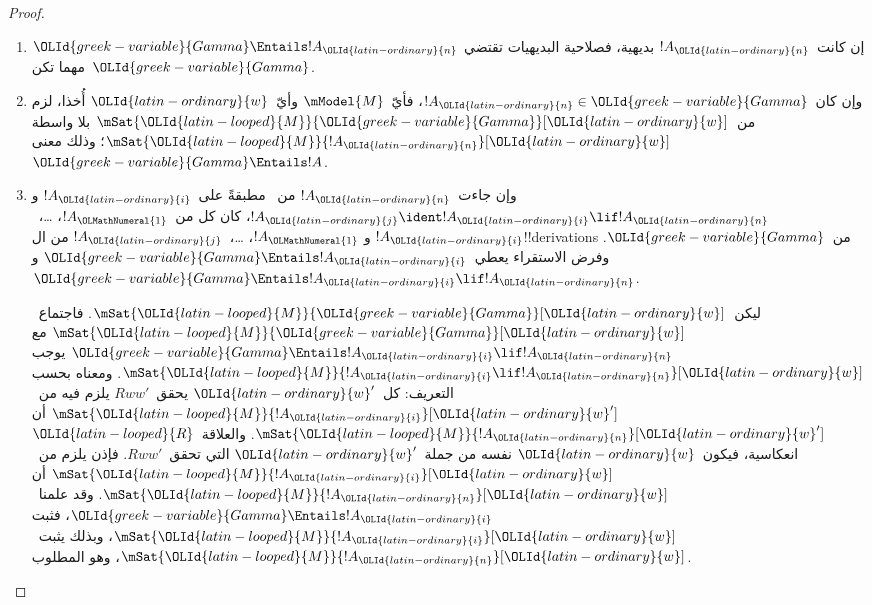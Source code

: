 \documentclass[../../../include/open-logic-section]{subfiles}
\begin{document}
\begin{proof}
  \begin{enumerate}
  \item إن كانت~$!A_{\OLId{latin-ordinary}{n}}$ بديهية، فصلاحية البديهيات تقتضي
    ${\OLId{greek-variable}{Gamma}} \Entails !A_{\OLId{latin-ordinary}{n}}$ مهما تكن~${\OLId{greek-variable}{Gamma}}$.
  \item وإن كان~$!A_{\OLId{latin-ordinary}{n}} \in {\OLId{greek-variable}{Gamma}}$، فأيّ~$\mModel{M}$ وأيّ~${\OLId{latin-ordinary}{w}}$ أُخذا،
    لزم من~$\mSat{{\OLId{latin-looped}{M}}}{{\OLId{greek-variable}{Gamma}}}[{\OLId{latin-ordinary}{w}}]$ بلا واسطة
    $\mSat{{\OLId{latin-looped}{M}}}{!A_{\OLId{latin-ordinary}{n}}}[{\OLId{latin-ordinary}{w}}]$؛ وذلك معنى~${\OLId{greek-variable}{Gamma}} \Entails !A$.
  \item وإن جاءت~$!A_{\OLId{latin-ordinary}{n}}$ من~\MP{} مطبقةً على~$!A_{\OLId{latin-ordinary}{i}}$ و
    $!A_{\OLId{latin-ordinary}{j}} \ident !A_{\OLId{latin-ordinary}{i}} \lif !A_{\OLId{latin-ordinary}{n}}$، كان كل من~$!A_{\OLMathNumeral{1}}$، \dots،~$!A_{\OLId{latin-ordinary}{i}}$ و
    $!A_{\OLMathNumeral{1}}$، \dots،~$!A_{\OLId{latin-ordinary}{j}}$ من ال!!{derivation}s من~${\OLId{greek-variable}{Gamma}}$. وفرض
    الاستقراء يعطي~${\OLId{greek-variable}{Gamma}} \Entails !A_{\OLId{latin-ordinary}{i}}$ و
    ${\OLId{greek-variable}{Gamma}} \Entails !A_{\OLId{latin-ordinary}{i}} \lif !A_{\OLId{latin-ordinary}{n}}$.

    ليكن~$\mSat{{\OLId{latin-looped}{M}}}{{\OLId{greek-variable}{Gamma}}}[{\OLId{latin-ordinary}{w}}]$. فاجتماع~$\mSat{{\OLId{latin-looped}{M}}}{{\OLId{greek-variable}{Gamma}}}[{\OLId{latin-ordinary}{w}}]$ مع
    ${\OLId{greek-variable}{Gamma}} \Entails !A_{\OLId{latin-ordinary}{i}} \lif !A_{\OLId{latin-ordinary}{n}}$ يوجب
    $\mSat{{\OLId{latin-looped}{M}}}{!A_{\OLId{latin-ordinary}{i}} \lif !A_{\OLId{latin-ordinary}{n}}}[{\OLId{latin-ordinary}{w}}]$. ومعناه بحسب التعريف: كل~${\OLId{latin-ordinary}{w}}'$
    يحقق~$Rww'$ يلزم فيه من~$\mSat{{\OLId{latin-looped}{M}}}{!A_{\OLId{latin-ordinary}{i}}}[{\OLId{latin-ordinary}{w}}']$ أن
    $\mSat{{\OLId{latin-looped}{M}}}{!A_{\OLId{latin-ordinary}{n}}}[{\OLId{latin-ordinary}{w}}']$. والعلاقة~${\OLId{latin-looped}{R}}$ انعكاسية، فيكون~${\OLId{latin-ordinary}{w}}$ نفسه من
    جملة~${\OLId{latin-ordinary}{w}}'$ التي تحقق~$Rww'$. فإذن يلزم من~$\mSat{{\OLId{latin-looped}{M}}}{!A_{\OLId{latin-ordinary}{i}}}[{\OLId{latin-ordinary}{w}}]$ أن
    $\mSat{{\OLId{latin-looped}{M}}}{!A_{\OLId{latin-ordinary}{n}}}[{\OLId{latin-ordinary}{w}}]$. وقد علمنا~${\OLId{greek-variable}{Gamma}} \Entails !A_{\OLId{latin-ordinary}{i}}$، فثبت
    $\mSat{{\OLId{latin-looped}{M}}}{!A_{\OLId{latin-ordinary}{i}}}[{\OLId{latin-ordinary}{w}}]$، وبذلك يثبت~$\mSat{{\OLId{latin-looped}{M}}}{!A_{\OLId{latin-ordinary}{n}}}[{\OLId{latin-ordinary}{w}}]$، وهو المطلوب.
  \end{enumerate}
\end{proof}
\end{document}
